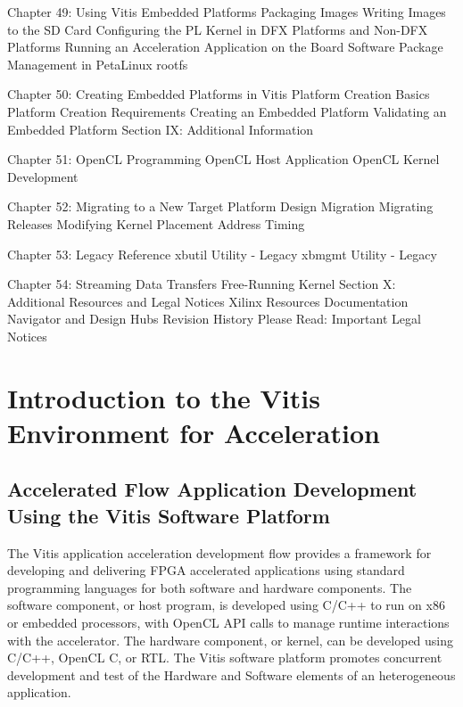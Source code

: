     Chapter 49: Using Vitis Embedded Platforms       
        Packaging Images      
        Writing Images to the SD Card        
        Configuring the PL Kernel in DFX Platforms and Non-DFX Platforms   
        Running an Acceleration Application on the Board 
        Software Package Management in PetaLinux rootfs        

    Chapter 50: Creating Embedded Platforms in Vitis 
        Platform Creation Basics       
        Platform Creation Requirements 
        Creating an Embedded Platform        
        Validating an Embedded Platform      
Section  IX: Additional Information      

    Chapter 51: OpenCL Programming 
        OpenCL Host Application     
        OpenCL Kernel Development   

    Chapter 52: Migrating to a New Target Platform   
        Design Migration      
        Migrating Releases    
        Modifying Kernel Placement     
        Address Timing        

    Chapter 53: Legacy Reference   
        xbutil Utility - Legacy     
        xbmgmt Utility - Legacy     

    Chapter 54: Streaming Data Transfers    
        Free-Running Kernel
Section  X: Additional Resources and Legal Notices      
        Xilinx Resources      
        Documentation Navigator and Design Hubs       
        Revision History      
        Please Read: Important Legal Notices    
\fi



\section{Introduction to the Vitis Environment for Acceleration} 
\subsection{Accelerated Flow Application Development Using the Vitis Software Platform} 

The Vitis application acceleration development flow provides a framework for developing and delivering FPGA accelerated applications using standard programming languages for both software and hardware components. The software component, or host program, is developed using C/C++ to run on x86 or embedded processors, with OpenCL API calls to manage runtime interactions with the accelerator. The hardware component, or kernel, can be developed using C/C++, OpenCL C, or RTL. The Vitis software platform promotes concurrent development and test of the Hardware and Software elements of an heterogeneous application.

